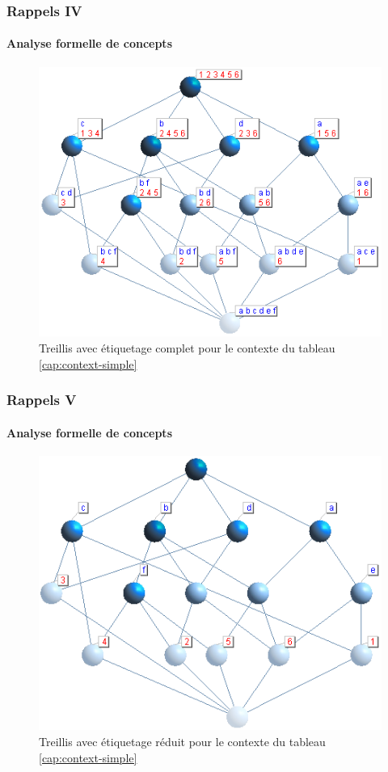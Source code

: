 \documentclass[french]{beamer}
\begin{document}
\begin{frame}
\frametitle{Rappels IV}
\framesubtitle{Analyse formelle de concepts}
\begin{figure}[H]
\begin{center}\includegraphics[scale=0.50]{figures/exemple-treillis.png}\end{center}
\caption{Treillis avec étiquetage complet pour le contexte du tableau \ref{cap:context-simple}}
\end{figure}
\end{frame}

\begin{frame}
\frametitle{Rappels V}
\framesubtitle{Analyse formelle de concepts}
\begin{figure}[H]
\label{cap:fig:treillis-reduced-labelling}
\begin{center}\includegraphics[scale=0.50]{figures/treillis-reduced-labelling.png}\end{center}
\caption{Treillis avec étiquetage réduit pour le contexte du tableau \ref{cap:context-simple}}
\end{figure}
\end{frame}
\end{document}
